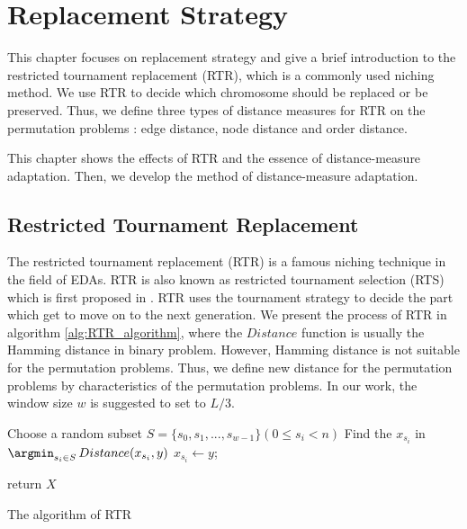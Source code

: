\section{Replacement Strategy}
\label{ch:replacement_strategy}

This chapter focuses on replacement strategy and give a brief introduction to the restricted tournament replacement (RTR), which is a commonly used niching method. We use  RTR to decide which chromosome should be replaced or be preserved. Thus, we define three types of distance measures for  RTR on the permutation problems : edge distance, node distance and order distance. 

This chapter shows the effects of RTR and the essence of distance-measure adaptation. Then, we develop the method of distance-measure adaptation. 


\subsection{Restricted Tournament Replacement}
The restricted tournament replacement (RTR) is a famous niching technique in the field of EDAs. RTR is also known as restricted tournament selection (RTS) which is first proposed in \citep{harik1995rts}. RTR uses the tournament strategy to decide the part which get to move on to the next generation. We present the process of RTR in algorithm \ref{alg:RTR_algorithm}, where the $Distance$ function is usually the Hamming distance in binary problem. However, Hamming distance is not suitable for the permutation problems. Thus, we define new distance for the permutation problems by characteristics of the permutation problems. In our work, the window size $w$ is suggested to set to $L/3$.


\begin{algorithm}[htbp]
    {
        Choose a random subset $S =\lbrace s_0, s_1, ..., s_{w-1}\rbrace (0\leq s_i <n)$\;
        Find the $x_{s_i}$ in $\mathop{\argmin}_{{s_i} \in S} Distance(x_{s_i},y)$\;
              {
        $x_{s_i} \leftarrow y$;
        }
        
    }
    return $X$\;
    \caption{The algorithm of RTR}
    \label{alg:RTR_algorithm}
\end{algorithm}

